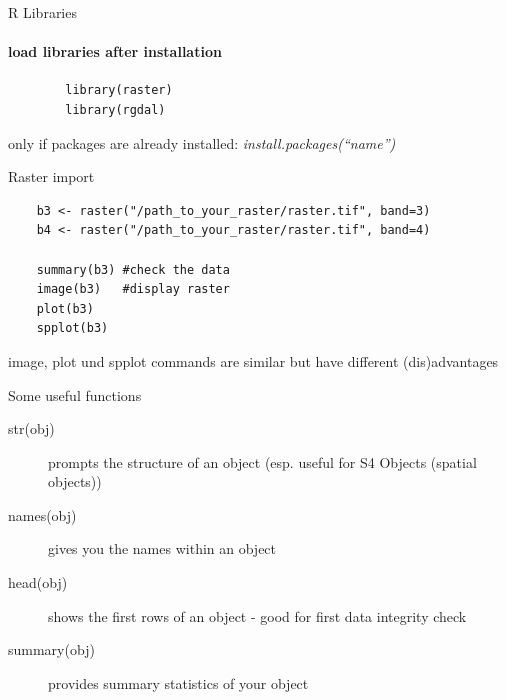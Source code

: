 \begin{frame}[fragile]{R Libraries}
      \framesubtitle{load libraries after installation}
 
    \begin{lstlisting}
	    library(raster)
	    library(rgdal)
    \end{lstlisting}

    only if packages are already installed: \textit{install.packages(``name'')}


\end{frame}


\begin{frame}[fragile]{Raster import}

\begin{lstlisting}
	b3 <- raster("/path_to_your_raster/raster.tif", band=3)
	b4 <- raster("/path_to_your_raster/raster.tif", band=4)

	summary(b3) #check the data
	image(b3)   #display raster
	plot(b3)
	spplot(b3)
    \end{lstlisting}
    
    
    \bigskip \pause image, plot und spplot commands are similar but have different (dis)advantages
    
\end{frame}




\begin{frame}{Some useful functions}
 
      \begin{description}
       \item[str(obj)] prompts the structure of an object (esp. useful for S4 Objects (spatial objects))
       \item[names(obj)] gives you the names within an object
       \item[head(obj)] shows the first rows of an object - good for first data integrity check
       \item[summary(obj)] provides summary statistics of your object
      \end{description}
 
\end{frame}


